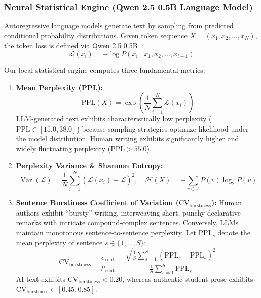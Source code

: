 \documentclass[journal]{IEEEtran}
\begin{document}
\subsubsection{Neural Statistical Engine (Qwen 2.5 0.5B Language Model)}
Autoregressive language models generate text by sampling from predicted conditional probability distributions. Given token sequence $X = (x_1, x_2, \dots, x_N)$, the token loss is defined via Qwen 2.5 0.5B~\cite{yang2024qwen25}:
\begin{equation}
    \mathcal{L}(x_i) = -\log P(x_i \mid x_1, x_2, \dots, x_{i-1})
\end{equation}

Our local statistical engine computes three fundamental metrics:
\begin{enumerate}
    \item \textbf{Mean Perplexity (PPL):}
    \begin{equation}
        \text{PPL}(X) = \exp\left(\frac{1}{N} \sum_{i=1}^{N} \mathcal{L}(x_i)\right)
    \end{equation}
    LLM-generated text exhibits characteristically low perplexity ($\text{PPL} \in [15.0, 38.0]$) because sampling strategies optimize likelihood under the model distribution. Human writing exhibits significantly higher and widely fluctuating perplexity ($\text{PPL} > 55.0$).
    \item \textbf{Perplexity Variance \& Shannon Entropy:}
    \begin{equation}
        \operatorname{Var}(\mathcal{L}) = \frac{1}{N} \sum_{i=1}^{N} (\mathcal{L}(x_i) - \bar{\mathcal{L}})^2, \quad \mathcal{H}(X) = -\sum_{v \in \mathcal{V}} P(v) \log_2 P(v)
    \end{equation}
    \item \textbf{Sentence Burstiness Coefficient of Variation ($\text{CV}_{\text{burstiness}}$):}
    Human authors exhibit ``bursty'' writing, interweaving short, punchy declarative remarks with intricate compound-complex sentences. Conversely, LLMs maintain monotonous sentence-to-sentence perplexity. Let $\text{PPL}_s$ denote the mean perplexity of sentence $s \in \{1, \dots, S\}$:
    \begin{equation}
        \text{CV}_{\text{burstiness}} = \frac{\sigma_{\text{sent}}}{\mu_{\text{sent}}} = \frac{\sqrt{\frac{1}{S}\sum_{s=1}^S (\text{PPL}_s - \overline{\text{PPL}}_s)^2}}{\frac{1}{S}\sum_{s=1}^S \text{PPL}_s}
    \end{equation}
    AI text exhibits $\text{CV}_{\text{burstiness}} < 0.20$, whereas authentic student prose exhibits $\text{CV}_{\text{burstiness}} \in [0.45, 0.85]$.
\end{enumerate}
\end{document}
